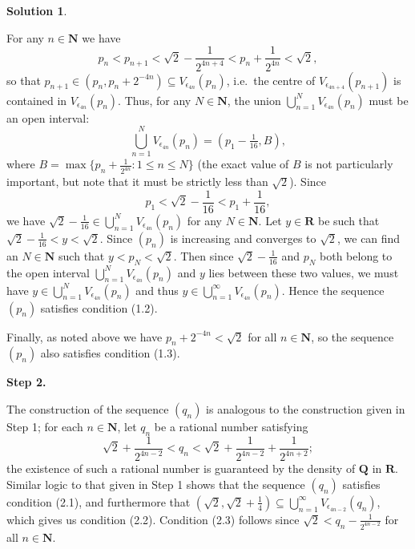 \documentclass[12pt]{article}
\theoremstyle{definition}
\theoremstyle{exercise}
\theoremstyle{solution}
\newtheorem*{solution}{Solution}
\newcommand{\N}{\mathbf{N}}
\newcommand{\Q}{\mathbf{Q}}
\newcommand{\R}{\mathbf{R}}
\begin{document}
\begin{solution}
\begin{enumerate}
        For any \( n \in \N \) we have
        \[
            p_n < p_{n+1} < \sqrt{2} - \frac{1}{2^{4n + 4}} < p_n + \frac{1}{2^{4n}} < \sqrt{2},
        \]
        so that \( p_{n+1} \in (p_n, p_n + 2^{-4n}) \subseteq V_{\epsilon_{4n}}(p_n) \), i.e.\ the centre of \( V_{\epsilon_{4n+4}}(p_{n+1}) \) is contained in \( V_{\epsilon_{4n}}(p_n) \). Thus, for any \( N \in \N \), the union \( \bigcup_{n=1}^N V_{\epsilon_{4n}}(p_n) \) must be an open interval:
        \[
            \bigcup_{n=1}^N V_{\epsilon_{4n}}(p_n) = \left( p_1 - \tfrac{1}{16}, B \right),
        \]
        where \( B = \max \{ p_n + \tfrac{1}{2^{4n}} : 1 \leq n \leq N \} \) (the exact value of \( B \) is not particularly important, but note that it must be strictly less than \( \sqrt{2} \)). Since
        \[
            p_1 < \sqrt{2} - \frac{1}{16} < p_1 + \frac{1}{16},
        \]
        we have \( \sqrt{2} - \tfrac{1}{16} \in \bigcup_{n=1}^N V_{\epsilon_{4n}}(p_n) \) for any \( N \in \N \). Let \( y \in \R \) be such that \( \sqrt{2} - \tfrac{1}{16} < y < \sqrt{2} \). Since \( (p_n) \) is increasing and converges to \( \sqrt{2} \), we can find an \( N \in \N \) such that \( y < p_N < \sqrt{2} \). Then since \( \sqrt{2} - \tfrac{1}{16} \) and \( p_N \) both belong to the open interval \( \bigcup_{n=1}^N V_{\epsilon_{4n}}(p_n) \) and \( y \) lies between these two values, we must have \( y \in \bigcup_{n=1}^N V_{\epsilon_{4n}}(p_n) \) and thus \( y \in \bigcup_{n=1}^{\infty} V_{\epsilon_{4n}}(p_n) \). Hence the sequence \( (p_n) \) satisfies condition (1.2).

        Finally, as noted above we have \( p_n + 2^{-4n} < \sqrt{2} \) for all \( n \in \N \), so the sequence \( (p_n) \) also satisfies condition (1.3).

        \noindent \hrulefill

        {\Large \textbf{Step 2.}}

        The construction of the sequence \( (q_n) \) is analogous to the construction given in Step 1; for each \( n \in \N \), let \( q_n \) be a rational number satisfying
        \[
            \sqrt{2} + \frac{1}{2^{4n - 2}} < q_n <  \sqrt{2} + \frac{1}{2^{4n - 2}} + \frac{1}{2^{4n + 2}};
        \]
        the existence of such a rational number is guaranteed by the density of \( \Q \) in \( \R \). Similar logic to that given in Step 1 shows that the sequence \( (q_n) \) satisfies condition (2.1), and furthermore that \( \left( \sqrt{2}, \sqrt{2} + \tfrac{1}{4} \right) \subseteq \bigcup_{n=1}^{\infty} V_{\epsilon_{4n-2}}(q_n) \), which gives us condition (2.2). Condition (2.3) follows since \( \sqrt{2} < q_n - \tfrac{1}{2^{4n - 2}} \) for all \( n \in \N \).


\end{enumerate}
\end{solution}
\end{document}
